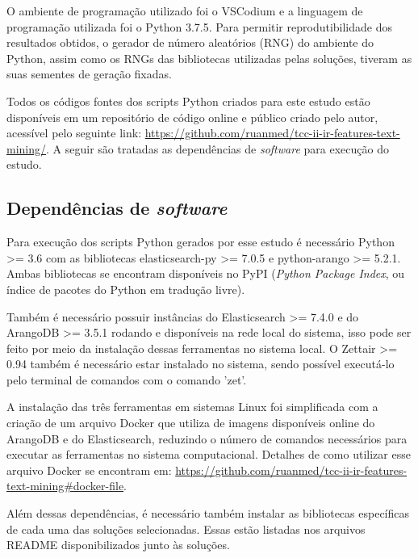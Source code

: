 		O ambiente de programação utilizado foi o VSCodium e a linguagem de programação utilizada foi o Python 3.7.5.
		Para permitir reprodutibilidade dos resultados obtidos, o gerador de número aleatórios (RNG) do ambiente do Python, assim como os RNGs das bibliotecas utilizadas pelas soluções, tiveram as suas sementes de geração fixadas.

		Todos os códigos fontes dos scripts Python criados para este estudo estão disponíveis em um repositório de código online e público criado pelo autor, acessível pelo seguinte link: \hyperlink{https://github.com/ruanmed/tcc-ii-ir-features-text-mining/}{https://github.com/ruanmed/tcc-ii-ir-features-text-mining/}.
		A seguir são tratadas as dependências de \textit{software} para execução do estudo.

		\subsection{Dependências de \textit{software}} \label{subsec:DependênciasSoftware}
			Para execução dos scripts Python gerados por esse estudo é necessário Python >= 3.6 com as bibliotecas elasticsearch-py >= 7.0.5 e python-arango >= 5.2.1.
			Ambas bibliotecas se encontram disponíveis no PyPI (\textit{Python Package Index}, ou índice de pacotes do Python em tradução livre).

			Também é necessário possuir instâncias do Elasticsearch >= 7.4.0 e do ArangoDB >= 3.5.1 rodando e disponíveis na rede local do sistema, isso pode ser feito por meio da instalação dessas ferramentas no sistema local.
			O Zettair >= 0.94 também é necessário estar instalado no sistema, sendo possível executá-lo pelo terminal de comandos com o comando 'zet'.

			A instalação das três ferramentas em sistemas Linux foi simplificada com a criação de um arquivo Docker que utiliza de imagens disponíveis online do ArangoDB e do Elasticsearch, reduzindo o número de comandos necessários para executar as ferramentas no sistema computacional.
			Detalhes de como utilizar esse arquivo Docker se encontram em: \hyperlink{https://github.com/ruanmed/tcc-ii-ir-features-text-mining\#docker-file}{https://github.com/ruanmed/tcc-ii-ir-features-text-mining\#docker-file}.

			Além dessas dependências, é necessário também instalar as bibliotecas específicas de cada uma das soluções selecionadas.
			Essas estão listadas nos arquivos README disponibilizados junto às soluções.

